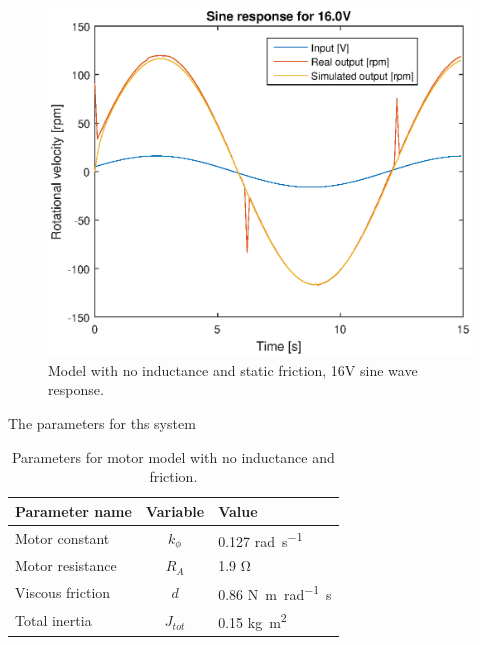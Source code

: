 \begin{figure}[H]
    \centering
    \includegraphics[width=\textwidth]{./img/testrig_16Vsine_no_i_no_fric.eps}
    \caption{Model with no inductance and static friction, 16V sine wave response.}
    \label{fig:sin16_nof}
\end{figure}
The parameters for ths system 
\begin{table}[H]
\caption{Parameters for motor model with no inductance and friction.}
\label{table:model1table}
\begin{center}
\begin{tabular}{lcl}
\textbf{Parameter name} & \textbf{Variable} & \textbf{Value}\\
\toprule
Motor constant & $k_{\phi}$ & 0.127 \si{\radian\per\second} \\
Motor resistance & $R_A$ & 1.9 \si{\ohm} \\
Viscous friction & $d$ & 0.86 \si{\newton\meter\per\radian\second} \\
Total inertia & $J_{tot}$ & 0.15 \si{\kilogram\meter^{2}} \\
\bottomrule
\end{tabular}
\end{center}
\end{table}

